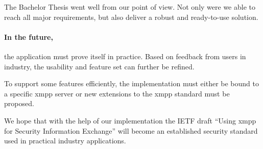 The Bachelor Thesis went well from our point of view.
Not only were we able to reach all major requirements, but also deliver a robust and ready-to-use solution.

\paragraph{In the future,} the application must prove itself in practice.
Based on feedback from users in industry, the usability and feature set can further be refined.

To support some features efficiently, the implementation must either be bound to a specific \gls{xmpp} server or new extensions to the \gls{xmpp} standard must be proposed.

We hope that with the help of our implementation the IETF draft ``Using \gls{xmpp} for Security Information Exchange'' will become an established security standard used in practical industry applications.
